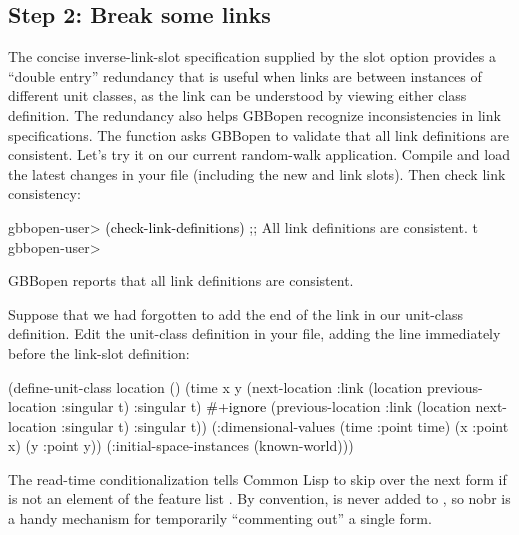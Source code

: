 \documentclass[10pt,twoside,english,pdftex]{article}
\begin{document}
\subsection*{Step 2: Break some links}

The concise inverse-link-slot specification supplied by the  slot
option provides a ``double entry'' redundancy that is useful when links are
between instances of different unit classes, as the link can be understood by
viewing either class definition.  The redundancy also helps GBBopen recognize
inconsistencies in link specifications.  The function
 asks GBBopen to validate that all link
definitions are consistent.  Let's try it on our current random-walk
application.  Compile and load the latest changes in your
 file (including the new
 and  link slots).
Then check link consistency:
%
\W\supp
\begin{example}
\textcolor{darkergray}{%
  gbbopen-user> \textcolor{black}{(check-link-definitions)}
  ;; All link definitions are consistent.
  t
  gbbopen-user>}
\end{example}
%
GBBopen reports that all link definitions are consistent.

Suppose that we had forgotten to add the  end
of the link in our  unit-class definition. Edit the
 unit-class definition in your
 file, adding the line
 immediately before the 
link-slot definition:
%
\W\supp
\begin{example}
\textcolor{darkergray}{%
  (define-unit-class location ()
    (time 
     x y
     (next-location
      :link (location previous-location :singular t) 
      :singular t)
      \textcolor{black}{\#+ignore}     
     (previous-location
      :link (location next-location :singular t)  
      :singular t))
    (:dimensional-values
      (time :point time)
      (x :point x)
      (y :point y))
    (:initial-space-instances (known-world)))}
\end{example}

The  read-time conditionalization tells Common Lisp to
skip over the next form if  is not an element of the feature list
.  By convention,  is never added to
, so nobr{} is a handy mechanism for
temporarily ``commenting out'' a single form.
\end{document}
